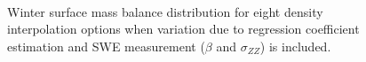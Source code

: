\documentclass[12pt]{article}
\begin{document}
\begin{figure}[H]
	\centering
	\\
	\caption{Winter surface mass balance distribution for eight density interpolation options when variation due to regression coefficient estimation and SWE measurement ($\beta$ and $\sigma_{ZZ}$) is included. }
	\label{fig:WSMB_DistributionbetaNzz}
\end{figure}
\end{document}
